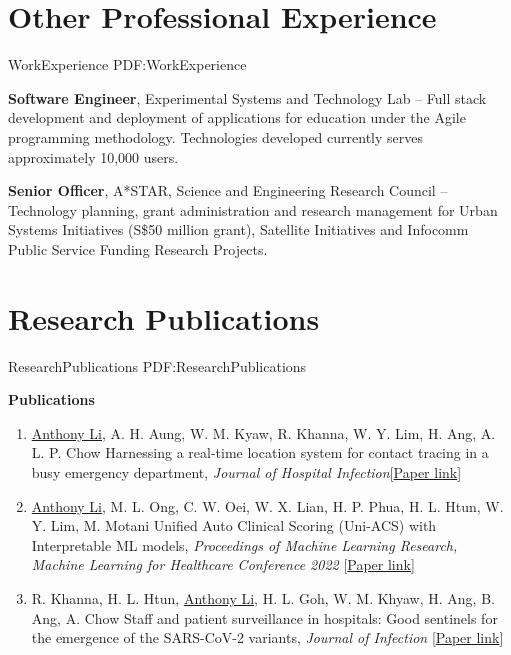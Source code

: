 \documentclass[letterpaper,10pt,oneside]{article}
\begin{document}
\begin{body}
\section
{Other Professional Experience}
{WorkExperience}
{PDF:WorkExperience}

{\textbf{Software Engineer}, Experimental Systems and Technology Lab}
\hfill
{} --
\BulletItem
Full stack development and deployment of applications for education under the Agile programming methodology. Technologies developed currently serves approximately 10,000 users.

\BigGap
{\textbf{Senior Officer}, A*STAR, Science and Engineering Research Council}
\hfill
{} --
\BulletItem
Technology planning, grant administration and research management for Urban Systems Initiatives (S\$50 million grant), Satellite Initiatives and Infocomm Public Service Funding Research Projects.



\section
{Research Publications}
{ResearchPublications}
{PDF:ResearchPublications}

\textbf{Publications}
\GapNoBreak
{}

\begin{enumerate}
\item \underline{Anthony Li}, A. H. Aung, W. M. Kyaw, R. Khanna, W. Y. Lim, H. Ang, A. L. P. Chow \textcolor{mygray}{Harnessing a real-time location system for contact tracing in a busy emergency department}, \textit{Journal of Hospital Infection}[\href{https://www.journalofhospitalinfection.com/article/S0195-6701(23)00279-7/fulltext}{Paper link}]

\item \underline{Anthony Li}, M. L. Ong, C. W. Oei, W. X. Lian, H. P. Phua, H. L. Htun, W. Y. Lim, M. Motani \textcolor{mygray}{Unified Auto Clinical Scoring (Uni-ACS) with Interpretable ML models}, \textit{Proceedings of Machine Learning Research, Machine Learning for Healthcare Conference 2022 }[\href{https://static1.squarespace.com/static/59d5ac1780bd5ef9c396eda6/t/62e975060329a7015f4f6eab/1659467015391/15+MLHC2022_Uni_ACS_Camera_Ready.pdf}{Paper link}]


\item R. Khanna, H. L. Htun, \underline{Anthony Li}, H. L. Goh, W. M. Khyaw, H. Ang, B. Ang, A. Chow \textcolor{mygray}{Staff and patient surveillance in hospitals: Good sentinels for the emergence of the SARS-CoV-2 variants}, \textit{Journal of Infection }[\href{https://www.journalofinfection.com/article/S0163-4453(22)00411-X/fulltext}{Paper link}]



\end{enumerate}
\end{body}
\end{document}
